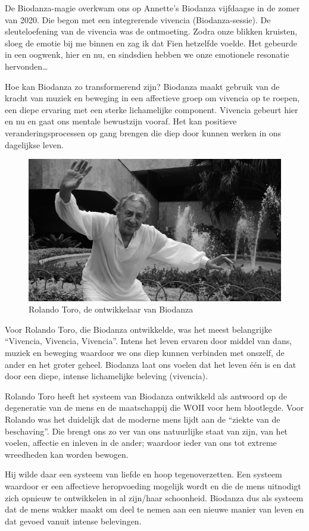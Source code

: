 \documentclass[
  11pt,
]{book}
\begin{document}
De Biodanza-magie overkwam ons op Annette's Biodanza vijfdaagse in de zomer van 2020. Die begon met een integrerende vivencia (Biodanza-sessie). De sleuteloefening van de vivencia was de ontmoeting. Zodra onze blikken kruisten, sloeg de emotie bij me binnen en zag ik dat Fien hetzelfde voelde. Het gebeurde in een oogwenk, hier en nu, en sindsdien hebben we onze emotionele resonatie hervonden\ldots{}

Hoe kan Biodanza zo transformerend zijn? Biodanza maakt gebruik van de kracht van muziek en beweging in een affectieve groep om vivencia op te roepen, een diepe ervaring met een sterke lichamelijke component. Vivencia gebeurt hier en nu en gaat ons mentale bewustzijn vooraf. Het kan positieve veranderingsprocessen op gang brengen die diep door kunnen werken in ons dagelijkse leven.

\begin{figure}

{\centering \includegraphics[width=0.45\linewidth]{./figs/rolando} 

}

\caption{Rolando Toro, de ontwikkelaar van Biodanza}\label{fig:rolandoToro}
\end{figure}

Voor Rolando Toro, die Biodanza ontwikkelde, was het meest belangrijke ``Vivencia, Vivencia, Vivencia''. Intens het leven ervaren door middel van dans, muziek en beweging waardoor we ons diep kunnen verbinden met onszelf, de ander en het groter geheel. Biodanza laat ons voelen dat het leven één is en dat door een diepe, intense lichamelijke beleving (vivencia).

Rolando Toro heeft het systeem van Biodanza ontwikkeld als antwoord op de degeneratie van de mens en de maatschappij die WOII voor hem blootlegde. Voor Rolando was het duidelijk dat de moderne mens lijdt aan de ``ziekte van de beschaving''. Die brengt ons zo ver van ons natuurlijke staat van zijn, van het voelen, affectie en inleven in de ander; waardoor ieder van ons tot extreme wreedheden kan worden bewogen.

Hij wilde daar een systeem van liefde en hoop tegenoverzetten. Een systeem waardoor er een affectieve heropvoeding mogelijk wordt en die de mens uitnodigt zich opnieuw te ontwikkelen in al zijn/haar schoonheid. Biodanza dus als systeem dat de mens wakker maakt om deel te nemen aan een nieuwe manier van leven en dat gevoed vanuit intense belevingen.
\end{document}
